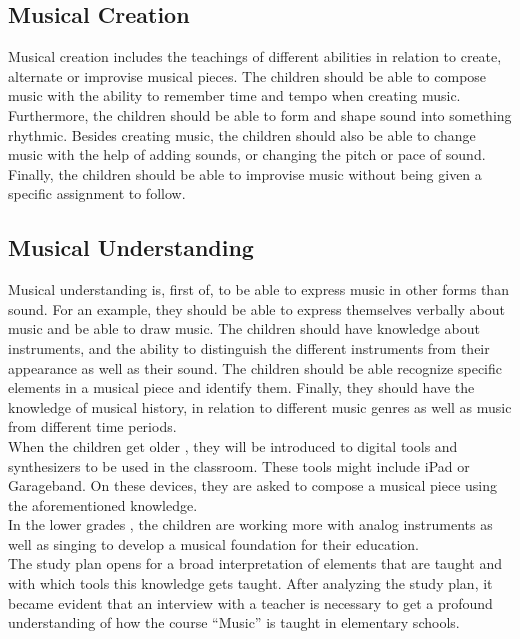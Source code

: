 \subsection*{Musical Creation}
Musical creation includes the teachings of different abilities in relation to create, alternate or improvise musical pieces. The children should be able to compose music with the ability to remember time and tempo when creating music. Furthermore, the children should be able to form and shape sound into something rhythmic. Besides creating music, the children should also be able to change music with the help of adding sounds, or changing the pitch or pace of sound. Finally, the children should be able to improvise music without being given a specific assignment to follow.

\subsection*{Musical Understanding}
Musical understanding is, first of, to be able to express music in other forms than sound. For an example, they should be able to express themselves verbally about music and be able to draw music. The children should have knowledge about instruments, and the ability to distinguish the different instruments from their appearance as well as their sound. The children should be able recognize specific elements in a musical piece and identify them. Finally, they should have the knowledge of musical history, in relation to different music genres as well as music from different time periods.
\\

When the children get older , they will be introduced to digital tools and synthesizers to be used in the classroom. These tools might include iPad or Garageband. On these devices, they are asked to compose a musical piece using the aforementioned knowledge.\\
In the lower grades , the children are working more with analog instruments as well as singing to develop a musical foundation for their education.
\\

The study plan opens for a broad interpretation of elements that are taught and with which tools this knowledge gets taught. After analyzing the study plan, it became evident that an interview with a teacher is necessary to get a profound understanding of how the course “Music” is taught in elementary schools.\\

